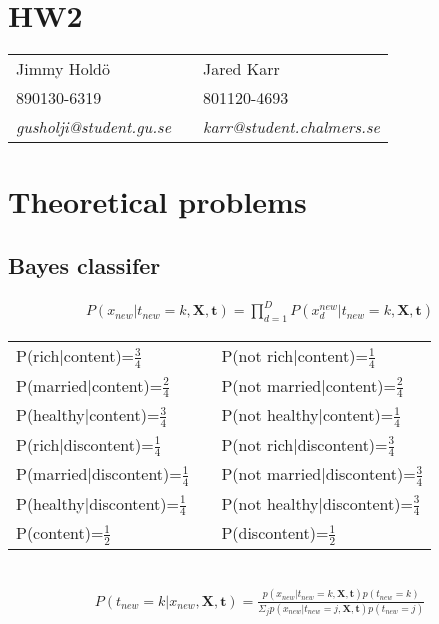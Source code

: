 \documentclass[a4paper,11pt]{article}
\begin{document}
\section*{HW2}

\begin{tabular*}{0.9\textwidth}{@{\extracolsep{\fill} } lll}
Jimmy Hold\"{o} & & Jared Karr\\
890130-6319 & & 801120-4693\\
\it{gusholji@student.gu.se} & & \it{karr@student.chalmers.se}\\
\end{tabular*}

\section{Theoretical problems}
\subsection{Bayes classifer}

\begin{align*}
P(x_{new}|t_{new}=k,\mathbf{X},\mathbf{t})=\prod_{d=1}^DP(x_d^{new}|t_{new}=k,\mathbf{X},\mathbf{t})
\end{align*}
\begin{tabular*}{0.9\textwidth}{@{\extracolsep{\fill} } lll}
P(rich|content)=$\frac{3}{4}$ & & P(not rich|content)=$\frac{1}{4}$\\
P(married|content)=$\frac{2}{4}$ & & P(not married|content)=$\frac{2}{4}$\\
P(healthy|content)=$\frac{3}{4}$ & & P(not healthy|content)=$\frac{1}{4}$\\

P(rich|discontent)=$\frac{1}{4}$ & & P(not rich|discontent)=$\frac{3}{4}$\\
P(married|discontent)=$\frac{1}{4}$ & & P(not married|discontent)=$\frac{3}{4}$\\
P(healthy|discontent)=$\frac{1}{4}$ & & P(not healthy|discontent)=$\frac{3}{4}$\\
P(content)=$\frac{1}{2}$ & & P(discontent)=$\frac{1}{2}$\\
\end{tabular*}\\

\begin{align*}
P(t_{new}=k|x_{new},\mathbf{X},\mathbf{t})=\frac{p(x_{new}|t_{new}=k,\mathbf{X},\mathbf{t})p(t_{new}=k)}{\Sigma_jp(x_{new}|t_{new}=j,\mathbf{X},\mathbf{t})p(t_{new}=j)}
\end{align*}
\end{document}
